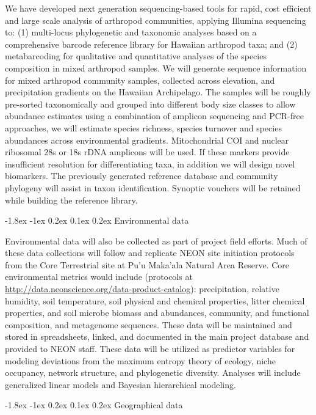 \documentclass[11pt]{article}
\makeatletter
\renewcommand\subsection{\@startsection{subsection}{1}{\z@}%
                                  {-1.8ex \@plus -1ex \@minus 0.2ex}%
                                  {0.1ex \@plus 0.2ex}%
                                  {\normalfont\large\bfseries}}
\makeatother
\begin{document}
We have developed next generation sequencing-based tools for rapid,
cost efficient and large scale analysis of arthropod communities,
applying Illumina sequencing to: (1) multi-locus phylogenetic and
taxonomic analyses based on a comprehensive barcode reference library
for Hawaiian arthropod taxa; and (2) metabarcoding for qualitative and
quantitative analyses of the species composition in mixed arthropod
samples. We will generate sequence information for mixed arthropod
community samples, collected across elevation, and precipitation
gradients on the Hawaiian Archipelago. The samples will be roughly
pre-sorted taxonomically and grouped into different body size classes
to allow abundance estimates using a combination of amplicon
sequencing and PCR-free approaches, we will estimate species richness,
species turnover and species abundances across environmental
gradients. Mitochondrial COI and nuclear ribosomal 28s or 18s rDNA
amplicons will be used. If these markers provide insufficient
resolution for differentiating taxa, in addition we will design novel
biomarkers. The previously generated reference database and community
phylogeny will assist in taxon identification. Synoptic vouchers will
be retained while building the reference library.

\subsection{Environmental data} 

Environmental data will also be collected as part of project field
efforts. Much of these data collections will follow and replicate NEON
site initiation protocols from the Core Terrestrial site at Pu’u
Maka’ala Natural Area Reserve. Core environmental metrics would
include (protocols at
\url{http://data.neonscience.org/data-product-catalog}):
precipitation, relative humidity, soil temperature, soil physical and
chemical properties, litter chemical properties, and soil microbe
biomass and abundances, community, and functional composition, and
metagenome sequences. These data will be maintained and stored in
spreadsheets, linked, and documented in the main project database and
provided to NEON staff. These data will be utilized as predictor
variables for modeling deviations from the maximum entropy theory of
ecology, niche occupancy, network structure, and phylogenetic
diversity.  Analyses will include generalized linear models and
Bayesian hierarchical modeling.

\subsection{Geographical data} 
\end{document}
